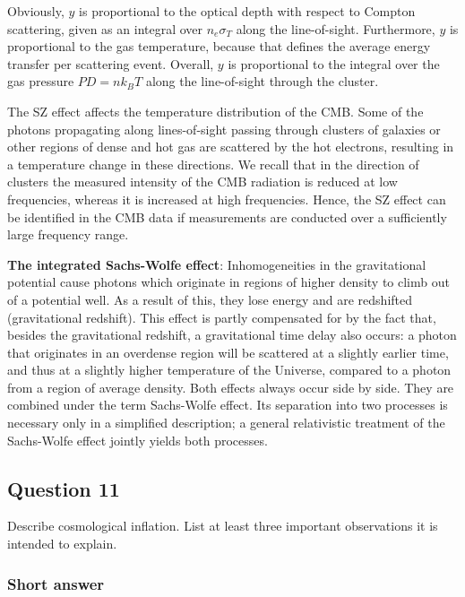 \documentclass[a4paper,11pt]{article}
\begin{document}
{\noindent}Obviously, $y$ is proportional to the optical depth with respect to Compton scattering, given as an integral over $n_e\sigma_T$ along the line-of-sight. Furthermore, $y$ is proportional to the gas temperature, because that defines the average energy transfer per scattering event. Overall, $y$ is proportional to the integral over the gas pressure $P D=nk_BT$ along the line-of-sight through the cluster.

{\noindent}The SZ effect affects the temperature distribution of the CMB. Some of the photons propagating along lines-of-sight passing through clusters of galaxies or other regions of dense and hot gas are scattered by the hot electrons, resulting in a temperature change in these directions. We recall that in the direction of clusters the measured intensity of the CMB radiation is reduced at low frequencies, whereas it is increased at high frequencies. Hence, the SZ effect can be identified in the CMB data if measurements are conducted over a sufficiently large frequency range.

{\noindent}\textbf{The integrated Sachs-Wolfe effect}: Inhomogeneities in the gravitational potential cause photons which originate in regions of higher density to climb out of a potential well. As a result of this, they lose energy and are redshifted (gravitational redshift). This effect is partly compensated for by the fact that, besides the gravitational redshift, a gravitational time delay also occurs: a photon that originates in an overdense region will be scattered at a slightly earlier time, and thus at a slightly higher temperature of the Universe, compared to a photon from a region of average density. Both effects always occur side by side. They are combined under the term Sachs-Wolfe effect. Its separation into two processes is necessary only in a simplified description; a general relativistic treatment of the Sachs-Wolfe effect jointly yields both processes.


%
%

\newpage
\subsection{Question 11}

Describe cosmological inflation. List at least three important observations it is intended to explain.

\subsubsection{Short answer}
\end{document}
